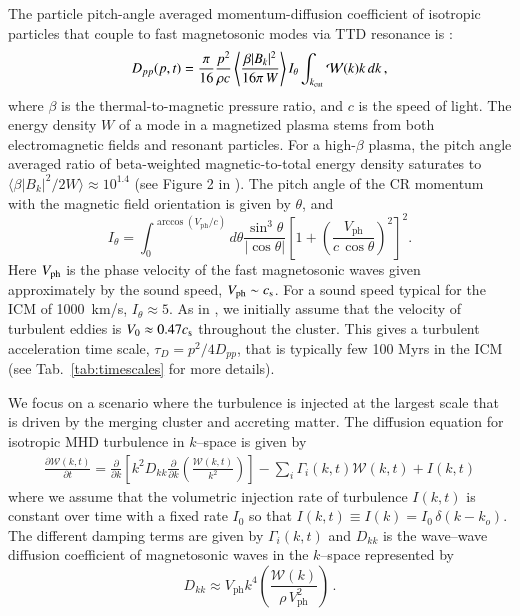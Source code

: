 \documentclass[fleqn,usenatbib,useAMS]{mnras}
\newcommand{\Vph}{V_\mathrm{ph}}
\begin{document}
The particle pitch-angle averaged momentum-diffusion coefficient of
isotropic particles that couple to fast magnetosonic modes via TTD
resonance is \citep[][ Eqn. 47]{brunetti07}:
\begin{eqnarray}
  D_{pp}(p,t) = \frac{\pi}{16} \frac{p^2}{\rho c}
  \left\langle\frac{\beta |B_k|^2}{16 \pi \,W}\right\rangle
  I_\theta
  \int_{k_{\mathrm{cut}}}\mathcal{W}(k)k\,d k\,,
\label{eq:dpp}
\end{eqnarray}
where $\beta$ is the thermal-to-magnetic pressure ratio, and $c$
is the speed of light. The energy density $W$ of a mode in a
magnetized plasma stems from both electromagnetic fields and resonant
particles. For a high-$\beta$ plasma, the pitch angle averaged ratio of
beta-weighted magnetic-to-total energy density saturates to $\langle\beta
|B_k|^2/2W\rangle\approx 10^{1.4}$ (see Figure 2 in
\citealt{brunetti07}). The pitch angle of the CR momentum with the
magnetic field orientation is given by $\theta$, and
\begin{equation}
  \label{eq:I_theta}
  I_\theta=\int_0^{\arccos(\Vph/c)} d\theta {\frac{ \sin^3 \theta }{
    |\cos \theta | }}
\left[1+\left(\frac{\Vph}{c\,\cos{\theta}}\right)^2\right]^2.
\end{equation}
Here $V_{\mathrm{ph}}$ is the phase velocity of the fast magnetosonic waves
given approximately by the sound speed, $\Vph \sim c_\rmn{s}$. For a
sound speed typical for the ICM of 1000~km/s, $I_\theta\approx5$. As
in \cite{brunetti07}, we initially assume that the velocity of
turbulent eddies is $V_0\approx 0.47 c_{\mathrm{s}}$ throughout the
cluster. This gives a turbulent acceleration time scale, $\tau_{D} =
p^2/4D_{pp}$, that is typically few 100 Myrs in the ICM (see
Tab.~\ref{tab:timescales} for more details).

We focus on a scenario where the turbulence is injected at the largest
scale that is driven by the merging cluster and accreting matter. The
diffusion equation for isotropic MHD turbulence in $k$--space is given
by
\begin{equation}
  \begin{aligned}
\frac{\partial {\mathcal W}(k,t)}{\partial t}
=
\frac{\partial}{\partial k}
\left[
k^2 D_{kk}
\frac{\partial}{\partial k}
\left( \frac{{\mathcal W}(k,t)}{k^2} \right)
\right]
- \sum_i \Gamma_i (k,t) {\mathcal W}(k,t)
+ I(k,t)
\end{aligned}
\label{modes_kinetic}
\end{equation}
where we assume that the volumetric injection rate of turbulence
$I(k,t)$ is constant over time with a fixed rate $I_0$ so that $I(k,t)
\equiv I(k) = I_0\,\delta (k - k_o)$. The different damping terms are
given by $\Gamma_i(k,t)$ and $D_{kk}$ is the wave--wave diffusion
coefficient of magnetosonic waves in the $k$--space represented by
\begin{equation}
  \label{eq:Dkk}
  D_{kk} \approx \Vph k^4
  \left(\frac{\mathcal{W}(k)}{\rho\,\Vph^2}\right)\,.
\end{equation}
\end{document}

